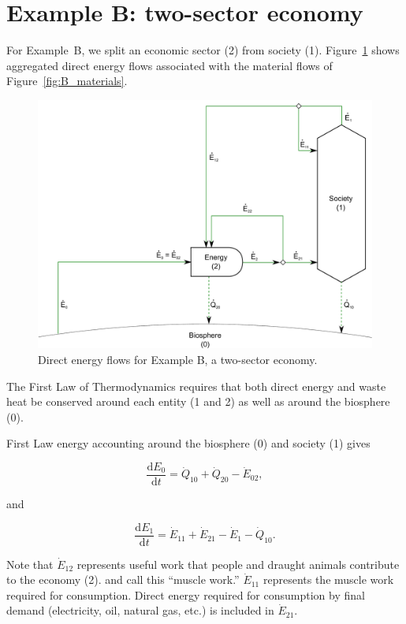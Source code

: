 \section{Example B: two-sector economy}
\label{sec:B_energy}

For Example~B, we split an economic sector (2) from 
society (1). Figure~\ref{fig:B_energy} shows aggregated
direct energy flows associated with the material flows of Figure~\ref{fig:B_materials}.

\begin{figure}[h!]
\centering
\includegraphics[width=0.8\linewidth]{Part_2/Chapter_Energy/images/2_sector_direct_energy.pdf}
\caption{Direct energy flows for Example B, a two-sector economy.}
\label{fig:B_energy}
\end{figure}

The First Law of Thermodynamics
requires that both 
direct energy and 
waste heat 
be conserved around each 
entity (1 and 2) as well as around the biosphere (0).

First Law energy accounting around the biosphere (0) and society (1) gives

\begin{equation} \label{eq:CV_E_dot_0}
	\frac{\mathrm{d}E_{0}}{\mathrm{d}t} 	 
	=  \dot{Q}_{10} 
	+ \dot{Q}_{20} 
	- \dot{E}_{02},
\end{equation}

\noindent and 

\begin{equation} \label{eq:CV_E_dot_1}
	\frac{\mathrm{d}E_{1}}{\mathrm{d}t} 	 
	= \dot{E}_{11} 
	+ \dot{E}_{21}
	- \dot{E}_{1}
	- \dot{Q}_{10}.
\end{equation}

Note that $\dot{E}_{12}$ represents useful work that people
and draught animals contribute to the economy (2). 
\citet{Ayres:2003ec} and \citet{Warr:2012cg} call this ``muscle work.'' 
$\dot{E}_{11}$ represents the muscle work required
for consumption. Direct energy required for consumption 
by final demand (electricity, oil, natural gas, etc.)
is included in $\dot{E}_{21}$.

